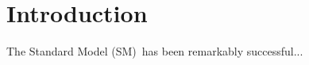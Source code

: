 \chapter[Introduction][Introduction]{Introduction}

The Standard Model (SM)\footnotemark~has been remarkably successful...
